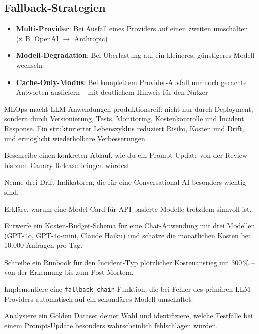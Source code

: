 \subsection{Fallback-Strategien}

\begin{itemize}[leftmargin=*]
    \item \textbf{Multi-Provider}: Bei Ausfall eines Providers auf einen zweiten umschalten (z.\,B. OpenAI $\rightarrow$ Anthropic)
    \item \textbf{Modell-Degradation}: Bei Überlastung auf ein kleineres, günstigeres Modell wechseln
    \item \textbf{Cache-Only-Modus}: Bei komplettem Provider-Ausfall nur noch gecachte Antworten ausliefern -- mit deutlichem Hinweis für den Nutzer
\end{itemize}

\begin{zusammenfassung}
MLOps macht LLM-Anwendungen produktionsreif: nicht nur durch Deployment, sondern durch Versionierung, Tests, Monitoring, Kostenkontrolle und Incident Response. Ein strukturierter Lebenszyklus reduziert Risiko, Kosten und Drift, und ermöglicht wiederholbare Verbesserungen.
\end{zusammenfassung}

\begin{uebungen}
    \item Beschreibe einen konkreten Ablauf, wie du ein Prompt-Update von der Review bis zum Canary-Release bringen würdest.
    \item Nenne drei Drift-Indikatoren, die für eine Conversational AI besonders wichtig sind.
    \item Erkläre, warum eine Model Card für API-basierte Modelle trotzdem sinnvoll ist.
    \item Entwerfe ein Kosten-Budget-Schema für eine Chat-Anwendung mit drei Modellen (GPT-4o, GPT-4o-mini, Claude Haiku) und schätze die monatlichen Kosten bei 10.000 Anfragen pro Tag.
    \item Schreibe ein Runbook für den Incident-Typ \glqq plötzlicher Kostenanstieg um 300\,\%\grqq{} -- von der Erkennung bis zum Post-Mortem.
    \item Implementiere eine \texttt{fallback\_chain}-Funktion, die bei Fehler des primären LLM-Providers automatisch auf ein sekundäres Modell umschaltet.
    \item Analysiere ein Golden Dataset deiner Wahl und identifiziere, welche Testfälle bei einem Prompt-Update besonders wahrscheinlich fehlschlagen würden.
\end{uebungen}

